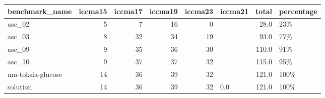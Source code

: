 \begin{tabular}{lrrrrlrl}
\toprule
benchmark\_name &  iccma15 &  iccma17 &  iccma19 &  iccma23 & iccma21 &  total & percentage \\
\midrule
asc\_02            &        5 &        7 &       16 &        0 &         &   28.0 &        23\% \\
asc\_03            &        8 &       32 &       34 &       19 &         &   93.0 &        77\% \\
asc\_09            &        9 &       35 &       36 &       30 &         &  110.0 &        91\% \\
asc\_10            &        9 &       37 &       37 &       32 &         &  115.0 &        95\% \\
mu-toksia-glucose &       14 &       36 &       39 &       32 &         &  121.0 &       100\% \\
solution          &       14 &       36 &       39 &       32 &     0.0 &  121.0 &       100\% \\
\bottomrule
\end{tabular}
